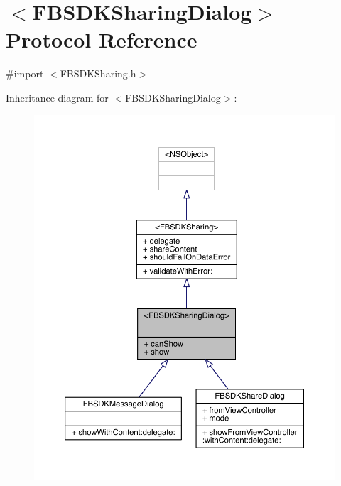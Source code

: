 \hypertarget{protocol_f_b_s_d_k_sharing_dialog-p}{\section{$<$F\-B\-S\-D\-K\-Sharing\-Dialog$>$ Protocol Reference}
\label{protocol_f_b_s_d_k_sharing_dialog-p}
}


{\ttfamily \#import $<$F\-B\-S\-D\-K\-Sharing.\-h$>$}



Inheritance diagram for $<$F\-B\-S\-D\-K\-Sharing\-Dialog$>$\-:
\nopagebreak
\begin{figure}[H]
\begin{center}
\leavevmode
\includegraphics[width=350pt]{protocol_f_b_s_d_k_sharing_dialog-p__inherit__graph}
\end{center}
\end{figure}


